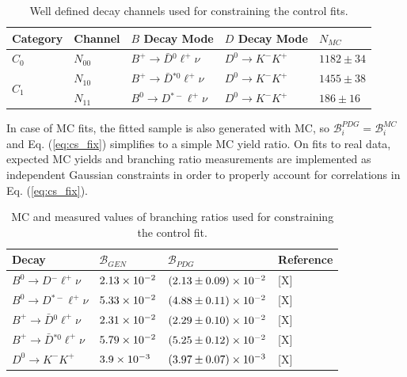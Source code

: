 \begin{table}[!htbp]
	\centering
	\begin{tabular}{|l|l|l|l|l|}
		\hline
		Category & Channel & $B$ Decay Mode & $D$ Decay Mode & $N_{MC}$ \\
		\hline
        $C_0$ & $N_{00}$ & $B^+ \to \bar D {}^{0} \ell^+ \nu$ & $D^0 \to K^-K^+$ & $1182 \pm 34$\\
        \hline
        \hline
		\multirow{2}{*}{$C_1$} & $N_{10}$ & $B^+ \to \bar D {}^{*0} \ell^+ \nu$ & $D^0 \to K^-K^+$ & $1455\pm38$\\
		\cline{2-5}
		& $N_{11}$ & $B^0 \to D {}^{*-} \ell^+ \nu$ & $D^0 \to K^-K^+$ & $186\pm16$\\
		\hline
	\end{tabular}
	\caption{Well defined decay channels used for constraining the control fits.}
	\label{tab:cs_constraint_table}
\end{table}

In case of MC fits, the fitted sample is also generated with MC, so $\mathcal{B}_{i}^{PDG} = \mathcal{B}_{i}^{MC}$ and Eq. (\ref{eq:cs_fix}) simplifies to a simple MC yield ratio. On fits to real data, expected MC yields and branching ratio measurements are implemented as independent Gaussian constraints in order to properly account for correlations in Eq. (\ref{eq:cs_fix}).
\begin{table}[!htbp]
	\centering
	\begin{tabular}{|l|l|l|l|}
		\hline
		Decay & $\mathcal{B}_{GEN}$ & $\mathcal{B}_{PDG}$ & Reference \\
		\hline
        $B^0 \to D {}^{-} \ell^+ \nu$ & $2.13\times 10^{-2}$ & $(2.13 \pm 0.09)\times 10^{-2}$ & [X]\\
        \hline
        $B^0 \to D {}^{*-} \ell^+ \nu$ & $5.33\times 10^{-2}$ & $(4.88 \pm 0.11)\times 10^{-2}$ & [X]\\
        \hline
        $B^+ \to \bar D {}^{0} \ell^+ \nu$ & $2.31\times 10^{-2}$ & $(2.29 \pm 0.10)\times 10^{-2}$ & [X]\\
        \hline
        $B^+ \to \bar D {}^{*0} \ell^+ \nu$ & $5.79\times 10^{-2}$ & $(5.25 \pm 0.12)\times 10^{-2}$ & [X]\\
        \hline
		$D^0 \to K^-K^+$ & $3.9\times 10^{-3}$ & $(3.97\pm0.07)\times 10^{-3}$ & [X] \\
		\hline
	\end{tabular}
	\caption{MC and measured values of branching ratios used for constraining the control fit.}
	\label{tab:cs_br_constraint_table}
\end{table}

